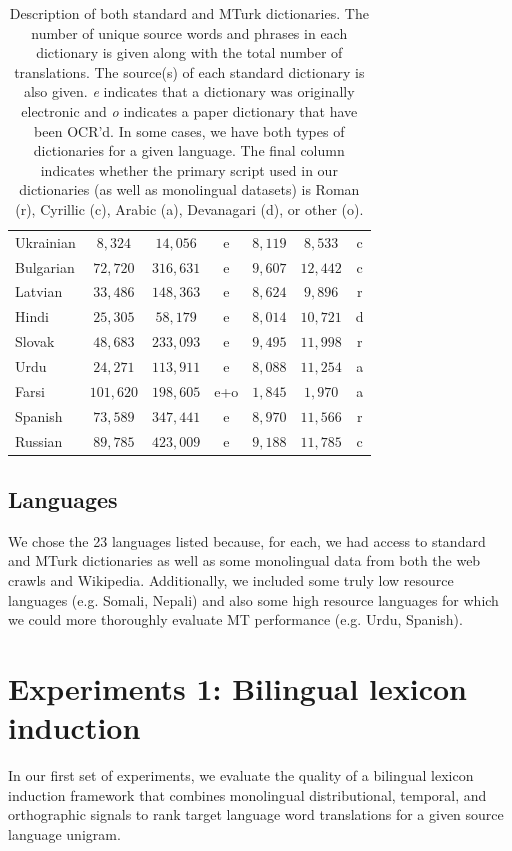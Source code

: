\documentclass[11pt]{article}
\begin{document}
\begin{table}
\begin{center}
\begin{tabular}{|l||c|c|c||c|c||c|}
Ukrainian    & $8,324$ & $14,056$ &  e   & $8,119$ & $8,533$ & c\\
Bulgarian  & $72,720$ & $316,631$ &  e  & $9,607$ &  $12,442$ & c \\
Latvian  & $33,486$ & $148,363$ &   e & $8,624$ &  $9,896$ & r \\
Hindi  & $25,305$ & $58,179$ &   e & $8,014$ & $10,721$ & d\\
Slovak  & $48,683$ & $233,093$   & e  & $9,495$ & $11,998$ & r \\
Urdu  & $24,271$ &  $113,911$  & e & $8,088$ & $11,254$ & a \\
Farsi  & $101,620$ &  $198,605$  &  e+o & $1,845$ & $1,970$ & a \\
Spanish  &  $73,589$  & $347,441$ & e  & $8,970$ & $11,566$ & r \\
Russian  & $89,785$ & $423,009$ & e & $9,188$ & $11,785$ & c \\
\hline
\end{tabular}
\end{center}
\caption{\label{table:dicts}Description of both standard and MTurk dictionaries. The number of unique source words and phrases in each dictionary is given along with the total number of translations. The source(s) of each standard dictionary is also given. {\it e} indicates that a dictionary was originally electronic and {\it o} indicates a paper dictionary that have been OCR'd. In some cases, we have both types of dictionaries for a given language. The final column indicates whether the primary script used in our dictionaries (as well as monolingual datasets) is Roman (r), Cyrillic (c), Arabic (a), Devanagari (d), or other (o).}
\end{table}

\subsection{Languages}
We chose the 23 languages listed because, for each, we had access to standard and MTurk dictionaries as well as some monolingual data from both the web crawls and Wikipedia. Additionally, we included some truly low resource languages (e.g. Somali, Nepali) and also some high resource languages for which we could more thoroughly evaluate MT performance (e.g. Urdu, Spanish).

\section{Experiments 1: Bilingual lexicon induction}\label{sec:lexinduc}
In our first set of experiments, we evaluate the quality of a bilingual lexicon induction framework that combines monolingual distributional, temporal, and orthographic signals to rank target language word translations for a given source language unigram. 
\end{document}

